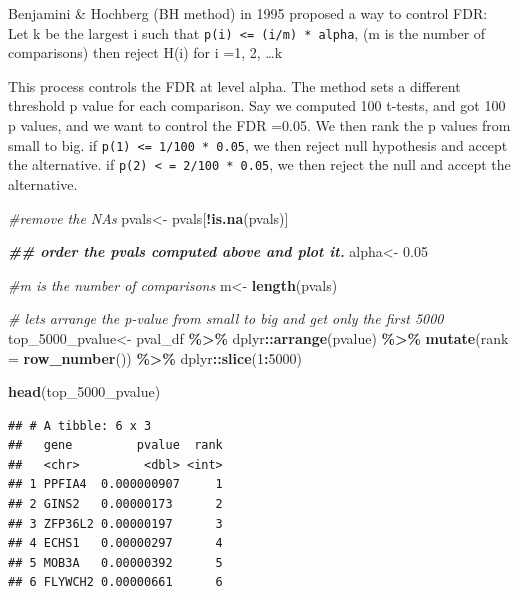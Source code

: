 \documentclass[
]{book}
\newenvironment{Shaded}{\begin{snugshade}}{\end{snugshade}}
\newcommand{\AttributeTok}[1]{\textcolor[rgb]{0.13,0.29,0.53}{#1}}
\newcommand{\CommentTok}[1]{\textcolor[rgb]{0.56,0.35,0.01}{\textit{#1}}}
\newcommand{\DecValTok}[1]{\textcolor[rgb]{0.00,0.00,0.81}{#1}}
\newcommand{\DocumentationTok}[1]{\textcolor[rgb]{0.56,0.35,0.01}{\textbf{\textit{#1}}}}
\newcommand{\FloatTok}[1]{\textcolor[rgb]{0.00,0.00,0.81}{#1}}
\newcommand{\FunctionTok}[1]{\textcolor[rgb]{0.13,0.29,0.53}{\textbf{#1}}}
\newcommand{\NormalTok}[1]{#1}
\newcommand{\OtherTok}[1]{\textcolor[rgb]{0.56,0.35,0.01}{#1}}
\newcommand{\SpecialCharTok}[1]{\textcolor[rgb]{0.81,0.36,0.00}{\textbf{#1}}}
\begin{document}
Benjamini \& Hochberg (BH method) in 1995 proposed a way to control FDR: Let k be the largest i such that \texttt{p(i)\ \textless{}=\ (i/m)\ *\ alpha}, (m is the number of comparisons) then reject H(i) for i =1, 2, \ldots k

This process controls the FDR at level alpha. The method sets a different threshold p value for each comparison. Say we computed 100 t-tests, and got 100 p values, and we want to control the FDR =0.05. We then rank the p values from small to big. if \texttt{p(1)\ \textless{}=\ 1/100\ *\ 0.05}, we then reject null hypothesis and accept the alternative. if \texttt{p(2)\ \textless{}\ =\ 2/100\ *\ 0.05}, we then reject the null and accept the alternative.

\begin{Shaded}
\begin{Highlighting}[]
\CommentTok{\#remove the NAs}
\NormalTok{pvals}\OtherTok{\textless{}{-}}\NormalTok{ pvals[}\SpecialCharTok{!}\FunctionTok{is.na}\NormalTok{(pvals)]}

\DocumentationTok{\#\# order the pvals computed above and plot it.}
\NormalTok{alpha}\OtherTok{\textless{}{-}} \FloatTok{0.05}

\CommentTok{\#m is the number of comparisons }
\NormalTok{m}\OtherTok{\textless{}{-}} \FunctionTok{length}\NormalTok{(pvals)}

\CommentTok{\# let\textquotesingle{}s arrange the p{-}value from small to big and get only the first 5000  }
\NormalTok{top\_5000\_pvalue}\OtherTok{\textless{}{-}}\NormalTok{ pval\_df }\SpecialCharTok{\%\textgreater{}\%}
\NormalTok{  dplyr}\SpecialCharTok{::}\FunctionTok{arrange}\NormalTok{(pvalue) }\SpecialCharTok{\%\textgreater{}\%}
  \FunctionTok{mutate}\NormalTok{(}\AttributeTok{rank =} \FunctionTok{row\_number}\NormalTok{()) }\SpecialCharTok{\%\textgreater{}\%}
\NormalTok{  dplyr}\SpecialCharTok{::}\FunctionTok{slice}\NormalTok{(}\DecValTok{1}\SpecialCharTok{:}\DecValTok{5000}\NormalTok{)}

\FunctionTok{head}\NormalTok{(top\_5000\_pvalue)  }
\end{Highlighting}
\end{Shaded}

\begin{verbatim}
## # A tibble: 6 x 3
##   gene         pvalue  rank
##   <chr>         <dbl> <int>
## 1 PPFIA4  0.000000907     1
## 2 GINS2   0.00000173      2
## 3 ZFP36L2 0.00000197      3
## 4 ECHS1   0.00000297      4
## 5 MOB3A   0.00000392      5
## 6 FLYWCH2 0.00000661      6
\end{verbatim}
\end{document}
